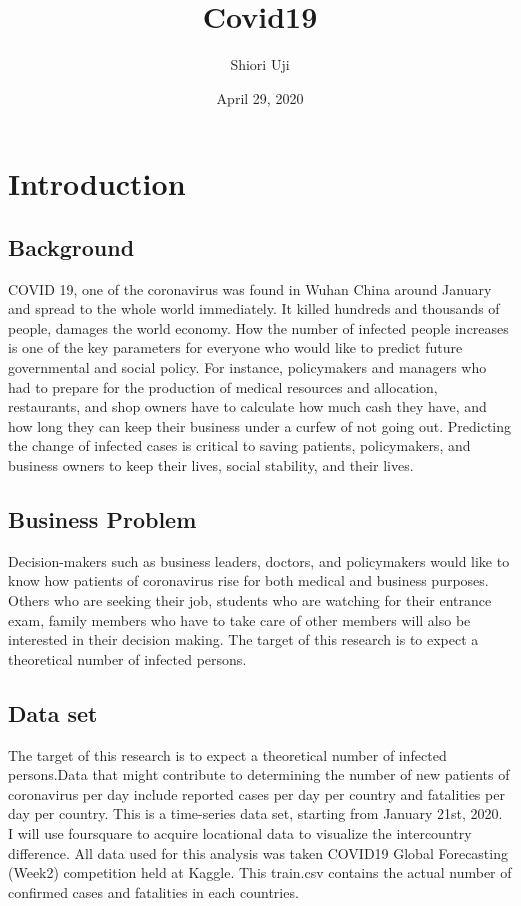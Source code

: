 \documentclass{article}
\title{Covid19}
\author{Shiori Uji}
\date{April 29, 2020}
\begin{document}
\maketitle
\section{Introduction}
\subsection{Background}
COVID 19, one of the coronavirus was found in Wuhan China around January and spread to the whole world immediately. It killed hundreds and thousands of people, damages the world economy. How the number of infected people increases is one of the key parameters for everyone who would like to predict future governmental and social policy. For instance, policymakers and managers who had to prepare for the production of medical resources and allocation, restaurants, and shop owners have to calculate how much cash they have, and how long they can keep their business under a curfew of not going out. Predicting the change of infected cases is critical to saving patients, policymakers, and business owners to keep their lives, social stability, and their lives.

\subsection{Business Problem}
Decision-makers such as business leaders, doctors, and policymakers would like to know how patients of coronavirus rise for both medical and business purposes. Others who are seeking their job, students who are watching for their entrance exam, family members who have to take care of other members will also be interested in their decision making. The target of this research is to expect a theoretical number of infected persons.

\subsection{Data set}
The target of this research is to expect a theoretical number of infected persons.Data that might contribute to determining the number of new patients of coronavirus per day include reported cases per day per country and fatalities per day per country. This is a time-series data set, starting from January 21st, 2020. I will use foursquare to acquire locational data to visualize the intercountry difference. All data used for this analysis was taken COVID19 Global Forecasting (Week2) competition held at Kaggle. This train.csv contains the actual number of confirmed cases and fatalities in each countries.
\end{document}
